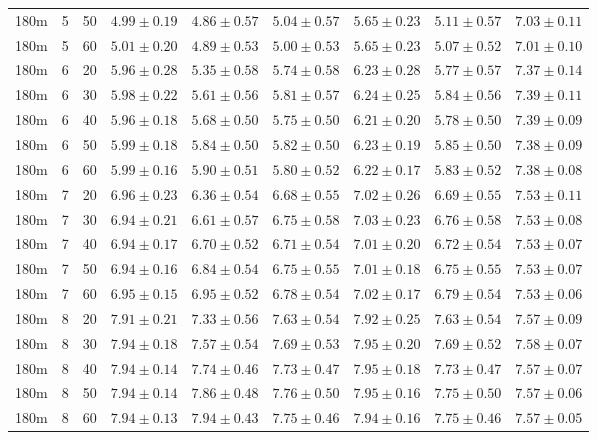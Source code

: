 \begin{table}
\begin{center}
\begin{tabular}{ccc|c|ccccc}
  180m &   5 &  50 & $4.99 \pm 0.19$ & $4.86 \pm 0.57$ & $5.04 \pm 0.57$ & $5.65 \pm 0.23$ & $5.11 \pm 0.57$ & $7.03 \pm 0.11$ \\ 
  180m &   5 &  60 & $5.01 \pm 0.20$ & $4.89 \pm 0.53$ & $5.00 \pm 0.53$ & $5.65 \pm 0.23$ & $5.07 \pm 0.52$ & $7.01 \pm 0.10$ \\ 
   \hline
180m &   6 &  20 & $5.96 \pm 0.28$ & $5.35 \pm 0.58$ & $5.74 \pm 0.58$ & $6.23 \pm 0.28$ & $5.77 \pm 0.57$ & $7.37 \pm 0.14$ \\ 
  180m &   6 &  30 & $5.98 \pm 0.22$ & $5.61 \pm 0.56$ & $5.81 \pm 0.57$ & $6.24 \pm 0.25$ & $5.84 \pm 0.56$ & $7.39 \pm 0.11$ \\ 
  180m &   6 &  40 & $5.96 \pm 0.18$ & $5.68 \pm 0.50$ & $5.75 \pm 0.50$ & $6.21 \pm 0.20$ & $5.78 \pm 0.50$ & $7.39 \pm 0.09$ \\ 
  180m &   6 &  50 & $5.99 \pm 0.18$ & $5.84 \pm 0.50$ & $5.82 \pm 0.50$ & $6.23 \pm 0.19$ & $5.85 \pm 0.50$ & $7.38 \pm 0.09$ \\ 
  180m &   6 &  60 & $5.99 \pm 0.16$ & $5.90 \pm 0.51$ & $5.80 \pm 0.52$ & $6.22 \pm 0.17$ & $5.83 \pm 0.52$ & $7.38 \pm 0.08$ \\ 
   \hline
180m &   7 &  20 & $6.96 \pm 0.23$ & $6.36 \pm 0.54$ & $6.68 \pm 0.55$ & $7.02 \pm 0.26$ & $6.69 \pm 0.55$ & $7.53 \pm 0.11$ \\ 
  180m &   7 &  30 & $6.94 \pm 0.21$ & $6.61 \pm 0.57$ & $6.75 \pm 0.58$ & $7.03 \pm 0.23$ & $6.76 \pm 0.58$ & $7.53 \pm 0.08$ \\ 
  180m &   7 &  40 & $6.94 \pm 0.17$ & $6.70 \pm 0.52$ & $6.71 \pm 0.54$ & $7.01 \pm 0.20$ & $6.72 \pm 0.54$ & $7.53 \pm 0.07$ \\ 
  180m &   7 &  50 & $6.94 \pm 0.16$ & $6.84 \pm 0.54$ & $6.75 \pm 0.55$ & $7.01 \pm 0.18$ & $6.75 \pm 0.55$ & $7.53 \pm 0.07$ \\ 
  180m &   7 &  60 & $6.95 \pm 0.15$ & $6.95 \pm 0.52$ & $6.78 \pm 0.54$ & $7.02 \pm 0.17$ & $6.79 \pm 0.54$ & $7.53 \pm 0.06$ \\ 
   \hline
180m &   8 &  20 & $7.91 \pm 0.21$ & $7.33 \pm 0.56$ & $7.63 \pm 0.54$ & $7.92 \pm 0.25$ & $7.63 \pm 0.54$ & $7.57 \pm 0.09$ \\ 
  180m &   8 &  30 & $7.94 \pm 0.18$ & $7.57 \pm 0.54$ & $7.69 \pm 0.53$ & $7.95 \pm 0.20$ & $7.69 \pm 0.52$ & $7.58 \pm 0.07$ \\ 
  180m &   8 &  40 & $7.94 \pm 0.14$ & $7.74 \pm 0.46$ & $7.73 \pm 0.47$ & $7.95 \pm 0.18$ & $7.73 \pm 0.47$ & $7.57 \pm 0.07$ \\ 
  180m &   8 &  50 & $7.94 \pm 0.14$ & $7.86 \pm 0.48$ & $7.76 \pm 0.50$ & $7.95 \pm 0.16$ & $7.75 \pm 0.50$ & $7.57 \pm 0.06$ \\ 
  180m &   8 &  60 & $7.94 \pm 0.13$ & $7.94 \pm 0.43$ & $7.75 \pm 0.46$ & $7.94 \pm 0.16$ & $7.75 \pm 0.46$ & $7.57 \pm 0.05$ \\ 
   \hline
\end{tabular}
\end{center}
\end{table}


